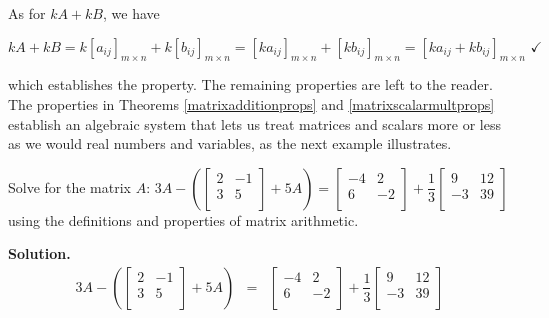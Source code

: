 As for $kA + kB$, we have

\[ kA + kB = k\left[a_{ij}\right]_{m \times n}+k\left[b_{ij}\right]_{m \times n} =  \left[ka_{ij}\right]_{m \times n}+\left[kb_{ij}\right]_{m \times n} = \left[ka_{ij} + kb_{ij}\right]_{m \times n} \, \, \checkmark \]

which establishes the property.  The remaining properties are left to the reader.  The properties in Theorems \ref{matrixadditionprops} and \ref{matrixscalarmultprops} establish an algebraic system that lets us treat matrices and scalars more or less as we would real numbers and variables, as the next example illustrates.


\begin{ex} \label{matrixaddscalarex} Solve for the matrix $A$:  $3A - \left(\left[ \begin{array}{rr} 2 & -1 \\ 3 & 5 \\ \end{array}\right] + 5A\right) = \left[ \begin{array}{rr} -4 & 2 \\ 6 & -2 \\ \end{array}\right] + \dfrac{1}{3} \left[ \begin{array}{rr} 9 & 12 \\ -3 & 39 \\ \end{array}\right]$ using the definitions and properties of matrix arithmetic.

\newpage

{\bf Solution.} \[ \begin{array}{rcl}

3A - \left(\left[ \begin{array}{rr} 2 & -1 \\ 3 & 5 \\ \end{array}\right] + 5A\right) & = & \left[ \begin{array}{rr} -4 & 2 \\ 6 & -2 \\ \end{array}\right] + \dfrac{1}{3} \left[ \begin{array}{rr} 9 & 12 \\ -3 & 39 \\ \end{array}\right]  \\ [13pt]




\end{array}\]
\end{ex}
